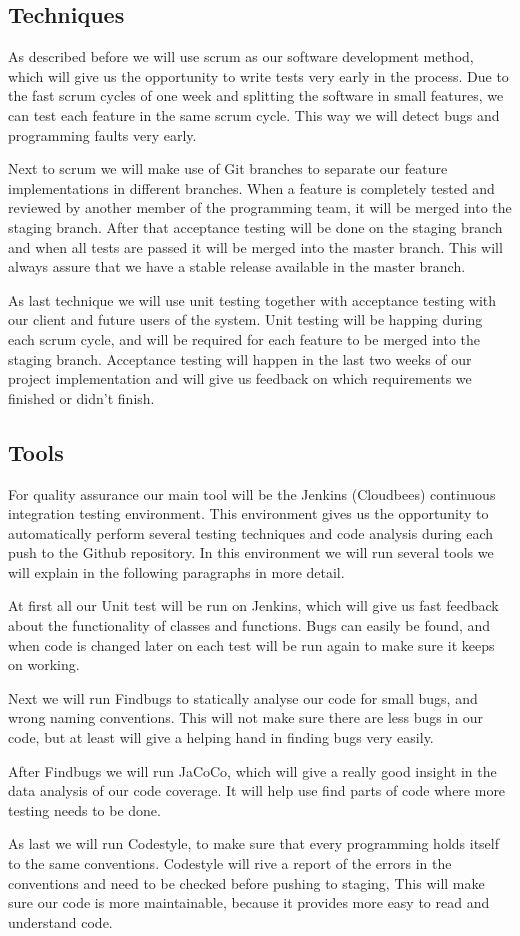 \documentclass[]{article}
\begin{document}
\subsection{Techniques}
As described before we will use scrum as our software development method, which will give us the opportunity to write tests very early in the process.
Due to the fast scrum cycles of one week and splitting the software in small features, we can test each feature in the same scrum cycle.
This way we will detect bugs and programming faults very early.

Next to scrum we will make use of Git branches to separate our feature implementations in different branches.
When a feature is completely tested and reviewed by another member of the programming team, it will be merged into the staging branch.
After that acceptance testing will be done on the staging branch and when all tests are passed it will be merged into the master branch.
This will always assure that we have a stable release available in the master branch.

As last technique we will use unit testing together with acceptance testing with our client and future users of the system.
Unit testing will be happing during each scrum cycle, and will be required for each feature to be merged into the staging branch.
Acceptance testing will happen in the last two weeks of our project implementation and will give us feedback on which requirements we finished or didn't finish.

\subsection{Tools}
For quality assurance our main tool will be the Jenkins (Cloudbees) continuous integration testing environment.
This environment gives us the opportunity to automatically perform several testing techniques and code analysis during each push to the Github repository.
In this environment we will run several tools we will explain in the following paragraphs in more detail.

At first all our Unit test will be run on Jenkins, which will give us fast feedback about the functionality of classes and functions.
Bugs can easily be found, and when code is changed later on each test will be run again to make sure it keeps on working.

Next we will run Findbugs to statically analyse our code for small bugs, and wrong naming conventions.
This will not make sure there are less bugs in our code, but at least will give a helping hand in finding bugs very easily.

After Findbugs we will run JaCoCo, which will give a really good insight in the data analysis of our code coverage.
It will help use find parts of code where more testing needs to be done.

As last we will run Codestyle, to make sure that every programming holds itself to the same conventions.
Codestyle will rive a report of the errors in the conventions and need to be checked before pushing to staging,
This will make sure our code is more maintainable, because it provides more easy to read and understand code.

\newpage


\end{document}
